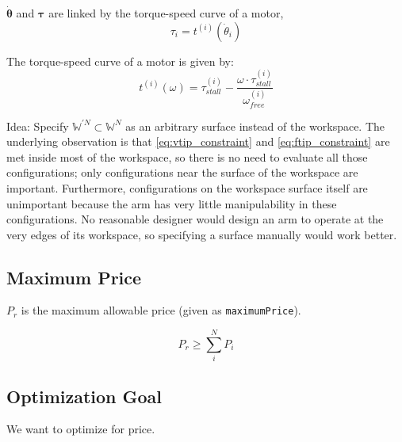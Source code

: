 \documentclass{article}
\begin{document}
$\boldsymbol{\dot{{\theta}}}$ and $\boldsymbol{\tau}$ are linked by the torque-speed curve of a motor,
\begin{equation}
    \tau_i = t^{(i)}(\dot{\theta}_i)
\end{equation}

The torque-speed curve of a motor is given by:
\begin{equation}
    t^{(i)}(\omega) = \tau_{stall}^{(i)} - \frac{\omega \cdot \tau_{stall}^{(i)}}{\omega_{free}^{(i)}}
\end{equation}

Idea: Specify $\mathbb{W}^{\prime N} \subset \mathbb{W}^N$ as an arbitrary surface instead of the
workspace. The underlying observation is that \ref{eq:vtip_constraint} and \ref{eq:ftip_constraint}
are met inside most of the workspace, so there is no need to evaluate all those configurations; only
configurations near the surface of the workspace are important. Furthermore, configurations on the
workspace surface itself are unimportant because the arm has very little manipulability in these
configurations. No reasonable designer would design an arm to operate at the very edges of its
workspace, so specifying a surface manually would work better.

\FloatBarrier
\subsection{Maximum Price}

$P_r$ is the maximum allowable price (given as \texttt{maximumPrice}).

\begin{equation}
    P_r \geq \sum_{i}^{N}{P_i}
\end{equation}

\FloatBarrier
\subsection{Optimization Goal}

We want to optimize for price.
\end{document}
